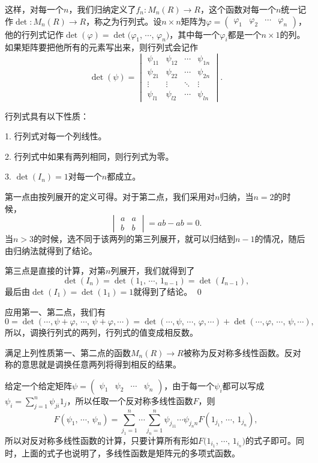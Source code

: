 这样，对每一个$n$，我们归纳定义了$f_n:M_n(R)\to R$，这个函数对每一个$n$统一记作$\det:M_n(R)\to R$，称之为行列式。设$n\times n$矩阵为$\varphi=\begin{pmatrix}\varphi_{1} & \varphi_{2} & \cdots & \varphi_{n}\end{pmatrix}$，他的行列式记作$\det(\varphi)=\det(\varphi_1$, $\cdots$, $\varphi_n)$，其中每一个$\varphi_i$都是一个$n\times 1$的列。如果矩阵要把他所有的元素写出来，则行列式会记作
\[
\det(\psi)=\begin{vmatrix}
	\psi_{11} & \psi_{12} & \cdots & \psi_{1n}\\
	\psi_{21} & \psi_{22} & \cdots & \psi_{2n}\\
	\vdots & \vdots & \ddots & \vdots \\
	\psi_{l1} & \psi_{l2} & \cdots & \psi_{ln}
\end{vmatrix}.
\]

\pro 行列式具有以下性质：

1. 行列式对每一个列线性。

2. 行列式中如果有两列相同，则行列式为零。

3. $\det(I_n)=1$对每一个$n$都成立。

\proof 
	第一点由按列展开的定义可得。对于第二点，我们采用对$n$归纳，当$n=2$的时候，
	\[
		\begin{vmatrix}a&a\\b&b\end{vmatrix}=ab-ab=0.
	\]
	当$n>3$的时候，选不同于该两列的第三列展开，就可以归结到$n-1$的情况，随后由归纳法就得到了结论。

	第三点是直接的计算，对第$n$列展开，我们就得到了
	\[
		\det(I_n)=\det(1_1,\,\cdots\!,\,1_{n-1})=\det(I_{n-1}),
	\]
	最后由$\det(I_1)=\det(1_1)=1$就得到了结论。
\qed

应用第一、第二点，我们有
\[
	0=\det(\cdots\!,\psi+\varphi,\,\cdots\!,\,\psi+\varphi,\cdots)=\det(\cdots\!,\psi,\,\cdots\!,\,\varphi,\cdots)+\det(\cdots\!,\varphi,\,\cdots\!,\,\psi,\cdots),
\]
所以，调换行列式的两列，行列式的值变成相反数。

满足上列性质第一、第二点的函数$M_n(R)\to R$被称为反对称多线性函数。反对称的意思就是调换任意两列将得到相反的结果。

\para 给定一个给定矩阵$\psi=\begin{pmatrix}\psi_{1} & \psi_{2} & \cdots & \psi_{n}\end{pmatrix}$，由于每一个$\psi_i$都可以写成$\psi_i=\sum_{j=1}^n\psi_{ji}1_j$，所以任取一个反对称多线性函数$F$，则
\[
	F(\psi_1,\,\cdots\!,\,\psi_n)=\sum_{j_1=1}^n\cdots \sum_{j_n=1}^n \psi_{j_11}\cdots \psi_{j_n n} F(1_{j_1},\,\cdots\!,\,1_{j_n}),
\]
所以对反对称多线性函数的计算，只要计算所有形如$F(1_{i_1}$, $\cdots$, $1_{i_n})$的式子即可。同时，上面的式子也说明了，多线性函数是矩阵元的多项式函数。

